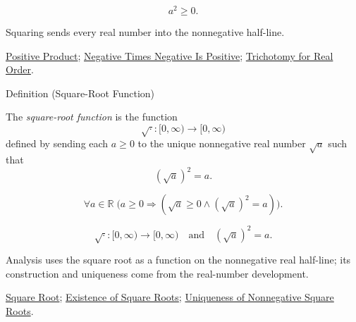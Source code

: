 \begin{remark*}
\[
a^2\ge0.
\]
\end{remark*}

\begin{remark*}[Interpretation]
Squaring sends every real number into the nonnegative half-line.
\end{remark*}

\begin{dependencies}
\hyperref[lem:positive-product]{Positive Product};
\hyperref[lem:negative-times-negative-is-positive]{Negative Times Negative Is Positive};
\hyperref[thm:real-order-trichotomy]{Trichotomy for Real Order}.
\end{dependencies}


\begin{definitionbox}{Definition (Square-Root Function)}
\begin{definition}
\label{def:real-square-root-function}
The \emph{square-root function} is the function
\[
\sqrt{\cdot}:[0,\infty)\to[0,\infty)
\]
defined by sending each $a\ge0$ to the unique nonnegative real number
$\sqrt a$ such that
\[
(\sqrt a)^2=a.
\]
\end{definition}
\end{definitionbox}
\begin{remark*}
\[
\forall a\in\mathbb{R}\;
\bigl(a\ge0\Rightarrow
(\sqrt a\ge0\land(\sqrt a)^2=a)\bigr).
\]
\end{remark*}
\begin{remark*}
\[
\sqrt{\cdot}:[0,\infty)\to[0,\infty)
\quad\text{and}\quad
(\sqrt a)^2=a.
\]
\end{remark*}
\begin{remark*}[Interpretation]
Analysis uses the square root as a function on the nonnegative real half-line;
its construction and uniqueness come from the real-number development.
\end{remark*}
\begin{dependencies}
\hyperref[def:square-root]{Square Root};
\hyperref[thm:existence-of-square-roots]{Existence of Square Roots};
\hyperref[thm:uniqueness-of-nonnegative-square-roots]{Uniqueness of Nonnegative Square Roots}.
\end{dependencies}

